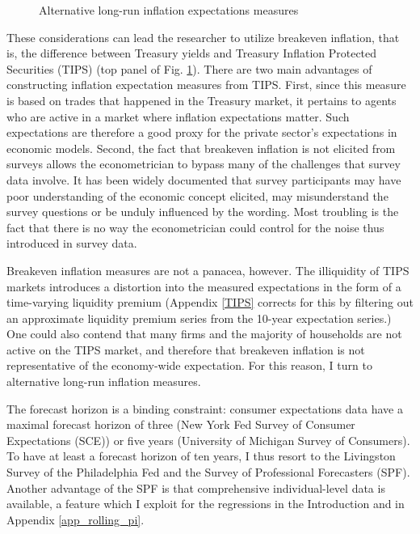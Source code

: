 \documentclass[11pt]{article}
\def \myFigPath {../../figures/}
\renewcommand{\[}{\begin{equation}}
\renewcommand{\]}{\end{equation}}
\def\myFigScale{0.3}
\def\fignameMarketEPiMoreHorizons{epi_be_in_data_command_anchoring_in_data_14_Sep_2020_18_12_59}
\def\fignameSPFLiv{epi_in_data_command_anchoring_in_data_14_Sep_2020_18_12_59}
\begin{document}
\begin{figure}[h!]
\caption{Alternative long-run inflation expectations measures}
\label{epi_alternative}
\end{figure}

These considerations can lead the researcher to utilize breakeven inflation, that is, the difference between Treasury yields and Treasury Inflation Protected Securities (TIPS) (top panel of Fig. \ref{epi_alternative}). There are two main advantages of constructing inflation expectation measures from TIPS. First, since this measure is based on trades that happened in the Treasury market, it pertains to agents who are active in a market where inflation expectations matter. Such expectations are therefore a good proxy for the private sector's expectations in economic models. Second, the fact that breakeven inflation is not elicited from surveys allows the econometrician to bypass many of the challenges that survey data involve. It has been widely documented that survey participants may have poor understanding of the economic concept elicited, may misunderstand the survey questions or be unduly influenced by the wording. Most troubling is the fact that there is no way the econometrician could control for the noise thus introduced in survey data. 

Breakeven inflation measures are not a panacea, however. The illiquidity of TIPS markets introduces a distortion into the measured expectations in the form of a time-varying liquidity premium (Appendix \ref{TIPS} corrects for this by filtering out an approximate liquidity premium series from the 10-year expectation series.) One could also contend that many firms and the majority of households are not active on the TIPS market, and therefore that breakeven inflation is not representative of the economy-wide expectation. For this reason, I turn to alternative long-run inflation measures.

The forecast horizon is a binding constraint: consumer expectations data have a maximal forecast horizon of three (New York Fed Survey of Consumer Expectations (SCE)) or five years (University of Michigan Survey of Consumers). To have at least a forecast horizon of ten years, I thus resort to the Livingston Survey of the Philadelphia Fed and the Survey of Professional Forecasters (SPF). Another advantage of the SPF is that comprehensive individual-level data is available, a feature which I exploit for the regressions in the Introduction and in Appendix \ref{app_rolling_pi}. 
\end{document}
